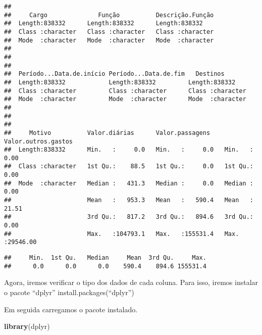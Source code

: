 \documentclass[
]{article}
\newenvironment{Shaded}{\begin{snugshade}}{\end{snugshade}}
\newcommand{\KeywordTok}[1]{\textcolor[rgb]{0.13,0.29,0.53}{\textbf{#1}}}
\newcommand{\NormalTok}[1]{#1}
\newcommand{\OperatorTok}[1]{\textcolor[rgb]{0.81,0.36,0.00}{\textbf{#1}}}
\begin{document}
\begin{verbatim}
##                                                              
##     Cargo              Função          Descrição.Função  
##  Length:838332      Length:838332      Length:838332     
##  Class :character   Class :character   Class :character  
##  Mode  :character   Mode  :character   Mode  :character  
##                                                          
##                                                          
##                                                          
##  Período...Data.de.início Período...Data.de.fim   Destinos        
##  Length:838332            Length:838332         Length:838332     
##  Class :character         Class :character      Class :character  
##  Mode  :character         Mode  :character      Mode  :character  
##                                                                   
##                                                                   
##                                                                   
##     Motivo          Valor.diárias      Valor.passagens    Valor.outros.gastos
##  Length:838332      Min.   :     0.0   Min.   :     0.0   Min.   :    0.00   
##  Class :character   1st Qu.:    88.5   1st Qu.:     0.0   1st Qu.:    0.00   
##  Mode  :character   Median :   431.3   Median :     0.0   Median :    0.00   
##                     Mean   :   953.3   Mean   :   590.4   Mean   :   21.51   
##                     3rd Qu.:   817.2   3rd Qu.:   894.6   3rd Qu.:    0.00   
##                     Max.   :104793.1   Max.   :155531.4   Max.   :29546.00
\end{verbatim}

\begin{Shaded}
\end{Shaded}

\begin{verbatim}
##     Min.  1st Qu.   Median     Mean  3rd Qu.     Max. 
##      0.0      0.0      0.0    590.4    894.6 155531.4
\end{verbatim}

Agora, iremos verificar o tipo dos dados de cada coluna. Para isso,
iremos instalar o pacote ``dplyr'' install.packages(``dplyr'')

Em seguida carregamos o pacote instalado.

\begin{Shaded}
\begin{Highlighting}[]
\KeywordTok{library}\NormalTok{(dplyr)}
\end{Highlighting}
\end{Shaded}
\end{document}
